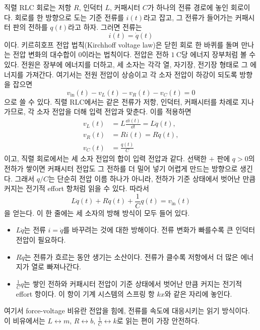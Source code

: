 직렬 RLC 회로는 저항 $R$, 인덕터 $L$, 커패시터 $C$가 하나의 전류 경로에 놓인 회로이다.
회로를 한 방향으로 도는 기준 전류를 $i(t)$라고 잡고, 그 전류가 들어가는 커패시터 판의 전하를 $q(t)$라고 하자.
그러면 전류는
\begin{equation}
  i(t) = \dot{q}(t)
\end{equation}
이다.
키르히호프 전압 법칙(Kirchhoff voltage law)은 닫힌 회로 한 바퀴를 돌며 만나는 전압 변화의 대수합이 0이라는 법칙이다.
전압은 전하 $1~\mathrm{C}$당 에너지 장부처럼 볼 수 있다.
전원은 장부에 에너지를 더하고, 세 소자는 각각 열, 자기장, 전기장 형태로 그 에너지를 가져간다.
여기서는 전원 전압이 상승이고 각 소자 전압이 하강이 되도록 방향을 잡으면
\begin{equation}
  v_{\mathrm{in}}(t)-v_L(t)-v_R(t)-v_C(t)=0
\end{equation}
으로 쓸 수 있다.
직렬 RLC에서는 같은 전류가 저항, 인덕터, 커패시터를 차례로 지나가므로, 각 소자 전압을 더해 입력 전압과 맞춘다.
이를 적용하면
\begin{align}
  v_L(t) &= L\frac{\dd i(t)}{\dd t}=L\ddot{q}(t), \\
  v_R(t) &= Ri(t)=R\dot{q}(t), \\
  v_C(t) &= \frac{q(t)}{C}
\end{align}
이고, 직렬 회로에서는 세 소자 전압의 합이 입력 전압과 같다.
선택한 $+$ 판에 $q>0$의 전하가 쌓이면 커패시터 전압도 그 전하를 더 밀어 넣기 어렵게 만드는 방향으로 생긴다.
그래서 $q/C$는 단순히 전압 이름 하나가 아니라, 전하가 기준 상태에서 벗어난 만큼 커지는 전기적 effort 항처럼 읽을 수 있다.
따라서
\begin{equation}
  L \ddot{q}(t) + R \dot{q}(t) + \frac{1}{C} q(t) = v_{\mathrm{in}}(t)
\end{equation}
을 얻는다.
이 한 줄에는 세 소자의 방해 방식이 모두 들어 있다.
\begin{itemize}
  \item $L\ddot{q}$는 전류 $i=\dot{q}$를 바꾸려는 것에 대한 방해이다. 전류 변화가 빠를수록 큰 인덕터 전압이 필요하다.
  \item $R\dot{q}$는 전류가 흐르는 동안 생기는 소산이다. 전류가 클수록 저항에서 더 많은 에너지가 열로 빠져나간다.
  \item $\frac{1}{C}q$는 쌓인 전하와 커패시터 전압이 기준 상태에서 벗어난 만큼 커지는 전기적 effort 항이다. 이 항이 기계 시스템의 스프링 항 $kx$와 같은 자리에 놓인다.
\end{itemize}
여기서 force-voltage 비유란 전압을 힘에, 전류를 속도에 대응시키는 읽기 방식이다.
이 비유에서는 $L\leftrightarrow m$, $R\leftrightarrow b$, $\frac{1}{C}\leftrightarrow k$로 읽는 편이 가장 안전하다.
